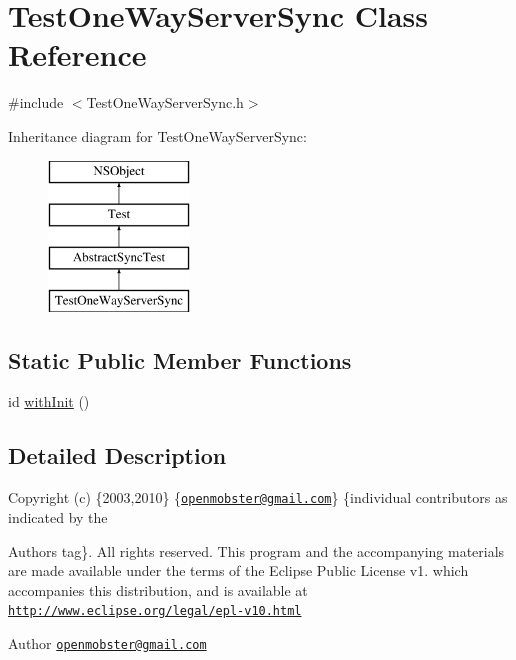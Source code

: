 \hypertarget{interface_test_one_way_server_sync}{
\section{\-Test\-One\-Way\-Server\-Sync \-Class \-Reference}
\label{interface_test_one_way_server_sync}
}


{\ttfamily \#include $<$\-Test\-One\-Way\-Server\-Sync.\-h$>$}

\-Inheritance diagram for \-Test\-One\-Way\-Server\-Sync\-:\begin{figure}[H]
\begin{center}
\leavevmode
\includegraphics[height=4.000000cm]{interface_test_one_way_server_sync}
\end{center}
\end{figure}
\subsection*{\-Static \-Public \-Member \-Functions}
\begin{DoxyCompactItemize}
\item 
id \hyperlink{interface_test_one_way_server_sync_a2b470ed930d1ce40fc6ca00d83ede513}{with\-Init} ()
\end{DoxyCompactItemize}


\subsection{\-Detailed \-Description}
\-Copyright (c) \{2003,2010\} \{\href{mailto:openmobster@gmail.com}{\tt openmobster@gmail.\-com}\} \{individual contributors as indicated by the \begin{DoxyAuthor}{\-Authors}
tag\}. \-All rights reserved. \-This program and the accompanying materials are made available under the terms of the \-Eclipse \-Public \-License v1. which accompanies this distribution, and is available at \href{http://www.eclipse.org/legal/epl-v10.html}{\tt http\-://www.\-eclipse.\-org/legal/epl-\/v10.\-html}
\end{DoxyAuthor}
\begin{DoxyAuthor}{\-Author}
\href{mailto:openmobster@gmail.com}{\tt openmobster@gmail.\-com} 
\end{DoxyAuthor}


